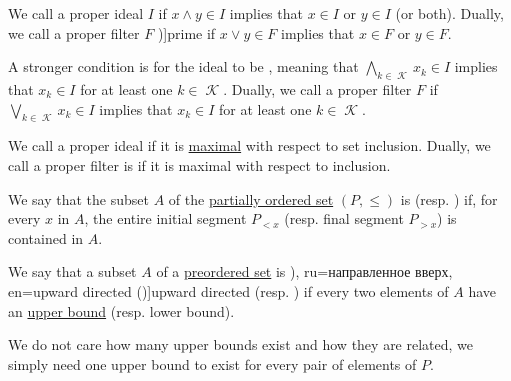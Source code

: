 \begin{definition}
\begin{thmenum}
    \begin{TwoColumns}
      We call a proper ideal \( I \)  if \( {x \wedge y \in I} \) implies that \( {x \in I} \) or \( {y \in I} \) (or both).
    \BeginSecondColumn
      Dually, we call a proper filter \( F \) \term[ru=простой (фильтр) (\cite[183]{Гуров2013})]{prime} if \( {x \vee y \in F} \) implies that \( {x \in F} \) or \( {y \in F} \).
    \end{TwoColumns}

    \begin{TwoColumns}
      A stronger condition is for the ideal to be , meaning that \( \bigwedge_{k \in \mscrK} x_k \in I \) implies that \( x_k \in I \) for at least one \( k \in \mscrK \).
    \BeginSecondColumn
      Dually, we call a proper filter \( F \)  if \( \bigvee_{k \in \mscrK} x_k \in I \) implies that \( x_k \in I \) for at least one \( k \in \mscrK \).
    \end{TwoColumns}

    \begin{TwoColumns}
      We call a proper ideal  if it is \hyperref[def:extremal_points/maximal_and_minimal_element]{maximal} with respect to set inclusion.
    \BeginSecondColumn
      Dually, we call a proper filter is  if it is maximal with respect to inclusion.
    \end{TwoColumns}
  \end{thmenum}
\end{definition}

\begin{definition}\label{def:closed_ordered_subset}
  We say that the subset \( A \) of the \hyperref[def:partially_ordered_set]{partially ordered set} \( (P, \leq) \) is  (resp. ) if, for every \( x \) in \( A \), the entire initial segment \( P_{<x} \) (resp. final segment \( P_{>x} \)) is contained in \( A \).
\end{definition}

\begin{definition}\label{def:directed_set}
  We say that a subset \( A \) of a \hyperref[def:preordered_set]{preordered set} is \term[bg=насочено надясно (множество) (\cite[10]{Проданов1982}), ru=направленное вверх, en=upward directed (\cite[25]{Johnstone1982})]{upward directed} (resp. ) if every two elements of \( A \) have an \hyperref[def:extremal_points/bounds]{upper bound} (resp. lower bound).
\end{definition}
\begin{comments}
  \item We do not care how many upper bounds exist and how they are related, we simply need one upper bound to exist for every pair of elements of \( P \).
\end{comments}

